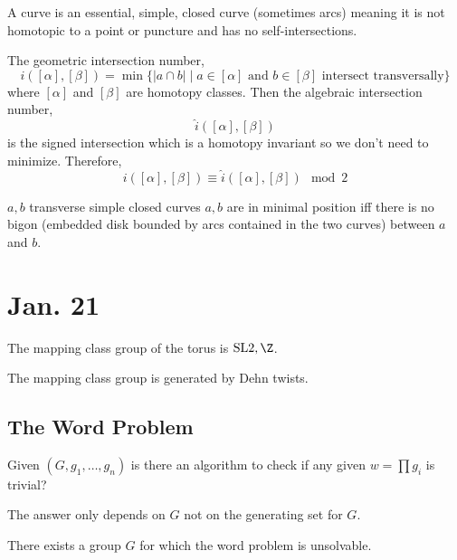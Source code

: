 \documentclass[12pt]{extarticle}
\begin{document}
\begin{defn}
A curve is an essential, simple, closed curve (sometimes arcs) meaning it is not homotopic to a point or puncture and has no self-intersections.
\end{defn}


\begin{defn}
The geometric intersection number,
\[ i([\alpha], [\beta]) = \min \{ |a \cap b | \mid a \in [\alpha] \text{ and } b \in [\beta] \text{ intersect transversally} \} \]
where $[\alpha]$ and $[\beta]$ are homotopy classes. Then the algebraic intersection number,
\[ \hat{i}([\alpha], [\beta]) \]
is the signed intersection which is a homotopy invariant so we don't need to minimize. Therefore,
\[ i([\alpha], [\beta]) \equiv \hat{i}([\alpha], [\beta]) \mod 2 \]
\end{defn}

\begin{lemma}
$a,b$ transverse simple closed curves $a,b$ are in minimal position iff there is no bigon (embedded disk bounded by arcs contained in the two curves) between $a$ and $b$. 
\end{lemma}

\section{Jan. 21}

\newcommand{\MCG}[1]{\mathrm{MCG}\left( #1 \right)}

The mapping class group of the torus is $\SL{2, \Z}$. 

\begin{thm}
The mapping class group is generated by Dehn twists.
\end{thm}

\subsection{The Word Problem}

Given $(G, g_1, \dots, g_n)$ is there an algorithm to check if any given $w = \prod g_i$ is trivial? 

\begin{rmk}
The answer only depends on $G$ not on the generating set for $G$.
\end{rmk}

\begin{rmk}
There exists a group $G$ for which the word problem is unsolvable.
\end{rmk}
\end{document}
